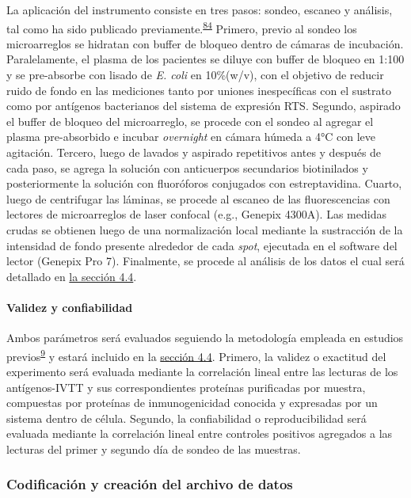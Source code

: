 \documentclass[]{article}
\let\oldparagraph\paragraph
\renewcommand{\paragraph}[1]{\oldparagraph{#1}\mbox{}}
\begin{document}
La aplicación del instrumento consiste en tres pasos: sondeo, escaneo y
análisis, tal como ha sido publicado
previamente.\textsuperscript{\protect\hyperlink{ref-Driguez2015}{84}}
Primero, previo al sondeo los microarreglos se hidratan con buffer de
bloqueo dentro de cámaras de incubación. Paralelamente, el plasma de los
pacientes se diluye con buffer de bloqueo en 1:100 y se pre-absorbe con
lisado de \emph{E. coli} en 10\%(w/v), con el objetivo de reducir ruido
de fondo en las mediciones tanto por uniones inespecíficas con el
sustrato como por antígenos bacterianos del sistema de expresión RTS.
Segundo, aspirado el buffer de bloqueo del microarreglo, se procede con
el sondeo al agregar el plasma pre-absorbido e incubar \emph{overnight}
en cámara húmeda a 4°C con leve agitación. Tercero, luego de lavados y
aspirado repetitivos antes y después de cada paso, se agrega la solución
con anticuerpos secundarios biotinilados y posteriormente la solución
con fluoróforos conjugados con estreptavidina. Cuarto, luego de
centrifugar las láminas, se procede al escaneo de las fluorescencias con
lectores de microarreglos de laser confocal (e.g., Genepix 4300A). Las
medidas crudas se obtienen luego de una normalización local mediante la
sustracción de la intensidad de fondo presente alrededor de cada
\emph{spot}, ejecutada en el software del lector (Genepix Pro 7).
Finalmente, se procede al análisis de los datos el cual será detallado
en \protect\hyperlink{procanal}{la sección 4.4}.

\hypertarget{validez}{\paragraph{Validez y
confiabilidad}\label{validez}}

Ambos parámetros será evaluados seguiendo la metodología empleada en
estudios
previos\textsuperscript{\protect\hyperlink{ref-crompton2010}{9}} y
estará incluido en la \protect\hyperlink{procanal}{sección 4.4}.
Primero, la validez o exactitud del experimento será evaluada mediante
la correlación lineal entre las lecturas de los antígenos-IVTT y sus
correspondientes proteínas purificadas por muestra, compuestas por
proteínas de inmunogenicidad conocida y expresadas por un sistema dentro
de célula. Segundo, la confiabilidad o reproducibilidad será evaluada
mediante la correlación lineal entre controles positivos agregados a las
lecturas del primer y segundo día de sondeo de las muestras.

\subsubsection{Codificación y creación del archivo de
datos}\label{codificacion-y-creacion-del-archivo-de-datos}
\end{document}
